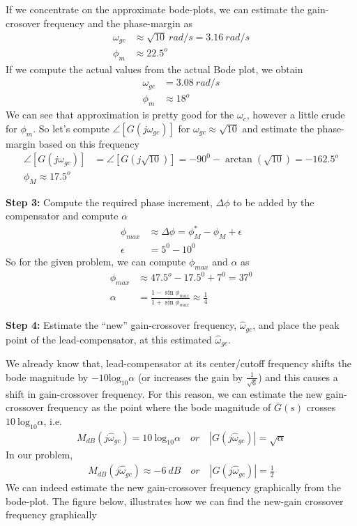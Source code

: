\documentclass[twoside]{article}
\begin{document}
If we concentrate on the approximate bode-plots, we can estimate
the gain-crosover frequency and the phase-margin as
%
\begin{align*}
  \omega_{gc} &\approx \sqrt{10} \ rad/s = 3.16 \ rad/s
  \\
  \phi_m &\approx 22.5^o
\end{align*}
%
If we compute the actual values from the actual Bode plot, we obtain
%
\begin{align*}
  \omega_{gc} &= 3.08 \ rad/s
  \\
  \phi_m &\approx 18^o
\end{align*}
%
We can see that approximation is pretty good for the
$\omega_c$, however a little crude for $\phi_m$. 
So let's compute $\angle [ G(j \omega_{gc}) ] $ for 
$\omega_{gc} \approx \sqrt{10}$ and estimate the 
phase-margin based on this frequency
%
\begin{align*}
  \angle [ G(j \omega_{gc}) ] &= \angle [ G(j \sqrt{10}) ] =
 -90^0 - \arctan \left( \sqrt{10} \right) =  -162.5^o
  \\
 \phi_M \approx 17.5^o
\end{align*}

\textbf{Step 3:} Compute the required phase increment, $\Delta \phi$ to be
added by the compensator and compute $\alpha$
%
\begin{align*}
   \phi_{max} &\approx \Delta \phi = \phi_M^* - \phi_M + \epsilon
  \\
  \epsilon &= 5^0 - 10^0
\end{align*}
%
So for the given problem, we can compute $\phi_{max}$
and $\alpha$ as
%
\begin{align*}
   \phi_{max} &\approx 47.5^o - 17.5^0 + 7^0 = 37^0
                \\
  \alpha &= \frac{1 - \sin \phi_{max}}{1 + \sin \phi_{max}} \approx \frac{1}{4}
\end{align*}

\textbf{Step 4:} Estimate the ``new'' gain-crossover frequency, 
$\hat{\omega}_{gc}$, and place the peak point of the lead-compensator,
at this estimated $\hat{\omega}_{gc}$. 

We already know that, lead-compensator at its
center/cutoff frequency shifts the bode magnitude 
by $-10 \mathrm{log}_{10} \alpha$ (or increases the gain 
by $\frac{1}{\sqrt{6}}$) and this causes a shift in
gain-crossover frequency. 
For this reason, we can estimate the new gain-crossover
frequency as the point where the bode magnitude of 
$\bar{G}(s)$ crosses $10 \ \mathrm{log}_{10} \alpha$,
i.e. 
%
\begin{align*}
  M_{dB}( j \hat{\omega}_{gc} ) = 10 \ \mathrm{log}_{10} \alpha
\quad or \quad
  |G(j \hat{\omega}_{gc})| = \sqrt{\alpha}
\end{align*}
%
In our problem, 
%
\begin{align*}
  M_{dB}( j \hat{\omega}_{gc} ) \approx -6 \ dB
\quad or \quad
  |G(j \hat{\omega}_{gc})| = \frac{1}{2}
\end{align*}
%
We can indeed estimate the new gain-crossover frequency graphically from the
bode-plot. The figure below, illustrates how we can find 
the new-gain crossover frequency graphically
\end{document}
